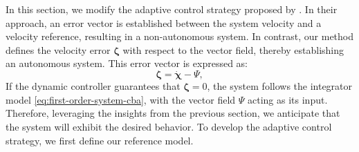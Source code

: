 In this section, we modify the adaptive control strategy proposed by \cite{Culbertson2021}. In their approach, an error vector is established between the system velocity and a velocity reference, resulting in a non-autonomous system. In contrast, our method defines the velocity error $\boldsymbol{\zeta}$ with respect to the vector field, thereby establishing an autonomous system. This error vector is expressed as:
\begin{equation}
    \boldsymbol{\zeta} = \dot{\boldsymbol{\chi}} - \Psi,\label{eq:errorvector-s}
\end{equation}
If the dynamic controller guarantees that $\boldsymbol{\zeta}=0$, the system follows the integrator model \eqref{eq:first-order-system-cba}, with the vector field $\Psi$ acting as its input. Therefore, leveraging the insights from the previous section, we anticipate that the system will exhibit the desired behavior. To develop the adaptive control strategy, we first define our reference model.

